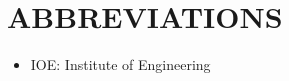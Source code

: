 \documentclass[main]{subfiles}
\begin{document}
\section*{\centering \Large{\MakeUppercase{Abbreviations}}}

\begin{itemize}
		\item[] IOE: Institute of Engineering
\end{itemize}
\end{document}
